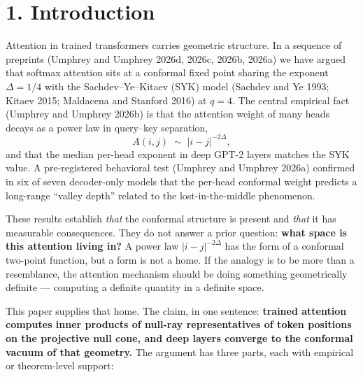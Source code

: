 \section{1. Introduction}\label{introduction}

Attention in trained transformers carries geometric structure. In a
sequence of preprints (Umphrey and Umphrey 2026d, 2026c, 2026b, 2026a)
we have argued that softmax attention sits at a conformal fixed point
sharing the exponent \(\Delta = 1/4\) with the Sachdev--Ye--Kitaev (SYK)
model (Sachdev and Ye 1993; Kitaev 2015; Maldacena and Stanford 2016) at
\(q=4\). The central empirical fact (Umphrey and Umphrey 2026b) is that
the attention weight of many heads decays as a power law in query--key
separation, \[
A(i,j) \;\sim\; |i-j|^{-2\Delta},
\] and that the median per-head exponent in deep GPT-2 layers matches
the SYK value. A pre-registered behavioral test (Umphrey and Umphrey
2026a) confirmed in six of seven decoder-only models that the per-head
conformal weight predicts a long-range ``valley depth'' related to the
lost-in-the-middle phenomenon.

These results establish \emph{that} the conformal structure is present
and \emph{that} it has measurable consequences. They do not answer a
prior question: \textbf{what space is this attention living in?} A power
law \(|i-j|^{-2\Delta}\) has the form of a conformal two-point function,
but a form is not a home. If the analogy is to be more than a
resemblance, the attention mechanism should be doing something
geometrically definite --- computing a definite quantity in a definite
space.

This paper supplies that home. The claim, in one sentence:
\textbf{trained attention computes inner products of null-ray
representatives of token positions on the projective null cone, and deep
layers converge to the conformal vacuum of that geometry.} The argument
has three parts, each with empirical or theorem-level support:


